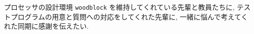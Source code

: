 \documentclass[../main.tex]{subfiles}
\begin{document}
  プロセッサの設計環境 \verb|woodblock| を維持してくれている先輩と教員たちに, 
  テストプログラムの用意と質問への対応をしてくれた先輩に, 
  一緒に悩んで考えてくれた同期に感謝を伝えたい.
\end{document}
